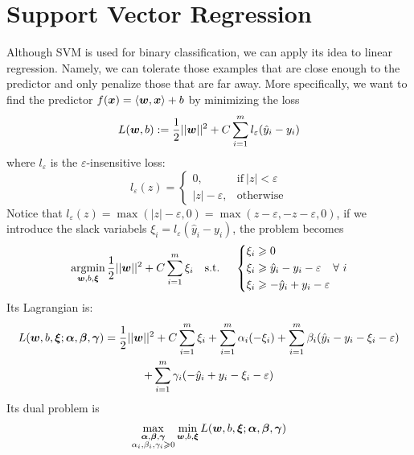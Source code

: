 \section{Support Vector Regression}
Although SVM is used for binary classification, we can apply its idea to linear regression. Namely, we can
tolerate those examples that are close enough to the predictor and only penalize those that are far away.
More specifically, we want to find the predictor $f(\boldsymbol{x}) = \langle\boldsymbol{w}, \boldsymbol{x}\rangle + b$ by minimizing the loss
\begin{equation}\label{SVR_loss}
    L(\boldsymbol{w}, b) := \frac{1}{2}||\boldsymbol{w}||^2 + C\sum_{i=1}^m l_\varepsilon(\hat{y}_i - y_i)
\end{equation}
where $l_\varepsilon$ is the $\varepsilon$-insensitive loss:
\begin{equation}\label{epsilon_insensitive_loss}
    l_\varepsilon(z) = 
    \begin{cases}
        0, & \text{if}~ |z| < \varepsilon\\
        |z| - \varepsilon, & \text{otherwise}
    \end{cases}
\end{equation}
Notice that $l_\varepsilon(z) = \max(|z| - \varepsilon, 0) = \max(z - \varepsilon, -z - \varepsilon, 0)$, if
we introduce the slack variabels $\xi_i = l_\varepsilon(\hat{y}_i - y_i)$, the problem becomes
\begin{equation}
    \operatorname*{argmin}_{\boldsymbol{w}, b, \boldsymbol{\xi}} \frac{1}{2}||\boldsymbol{w}||^2 + C\sum_{i=1}^m \xi_i \quad\text{s.t.\ }\quad\left\{
    \begin{aligned}
        &\xi_i \geqslant 0\\
        &\xi_i \geqslant \hat{y}_i - y_i - \varepsilon\\
        &\xi_i \geqslant -\hat{y}_i + y_i - \varepsilon
    \end{aligned}\right.\forall~ i
\end{equation}
Its Lagrangian is:
\begin{multline}
    L(\boldsymbol{w}, b, \boldsymbol{\xi}; \boldsymbol{\alpha}, \boldsymbol{\beta}, \boldsymbol{\gamma}) = \frac{1}{2} ||\boldsymbol{w}||^2 + C\sum_{i=1}^m \xi_i
    + \sum_{i=1}^m \alpha_i (-\xi_i) + \sum_{i=1}^m \beta_i (\hat{y}_i - y_i -\xi_i -\varepsilon)
    \\+ \sum_{i=1}^m \gamma_i (-\hat{y}_i + y_i - \xi_i -\varepsilon)
\end{multline}
Its dual problem is 
$$\max_{\substack{\boldsymbol{\alpha}, \boldsymbol{\beta}, \boldsymbol{\gamma}\\ \alpha_i, \beta_i, \gamma_i \geqslant 0}}
\min_{\boldsymbol{w}, b, \boldsymbol{\xi}} L(\boldsymbol{w}, b, \boldsymbol{\xi};\boldsymbol{\alpha}, \boldsymbol{\beta}, \boldsymbol{\gamma})$$
